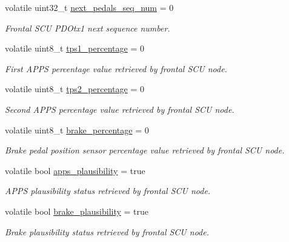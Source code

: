 \begin{DoxyCompactItemize}
volatile uint32\+\_\+t \mbox{\hyperlink{group___c_a_n__servizi__group_gadcbd4ad67b50cf61731266bf5c5ba158}{next\+\_\+pedals\+\_\+seq\+\_\+num}} = 0
\begin{DoxyCompactList}\small\item\em Frontal S\+CU P\+D\+Otx1 next sequence number. \end{DoxyCompactList}\item 
volatile uint8\+\_\+t \mbox{\hyperlink{group___c_a_n__servizi__group_ga1d42f28ccf027a3243fad064fa47ef81}{tps1\+\_\+percentage}} = 0
\begin{DoxyCompactList}\small\item\em First A\+P\+PS percentage value retrieved by frontal S\+CU node. \end{DoxyCompactList}\item 
volatile uint8\+\_\+t \mbox{\hyperlink{group___c_a_n__servizi__group_gaf69d82f83885abc5adbd5fcbf4c421cf}{tps2\+\_\+percentage}} = 0
\begin{DoxyCompactList}\small\item\em Second A\+P\+PS percentage value retrieved by frontal S\+CU node. \end{DoxyCompactList}\item 
volatile uint8\+\_\+t \mbox{\hyperlink{group___c_a_n__servizi__group_ga8e50a30864da7026531520887968d4c0}{brake\+\_\+percentage}} = 0
\begin{DoxyCompactList}\small\item\em Brake pedal position sensor percentage value retrieved by frontal S\+CU node. \end{DoxyCompactList}\item 
\mbox{\label{group___c_a_n__servizi__group_gaa9de48f5a49bc92a608ed315c087f3a6}} 
volatile bool \mbox{\hyperlink{group___c_a_n__servizi__group_gaa9de48f5a49bc92a608ed315c087f3a6}{apps\+\_\+plausibility}} = true
\begin{DoxyCompactList}\small\item\em A\+P\+PS plausibility status retrieved by frontal S\+CU node. \end{DoxyCompactList}\item 
\mbox{\label{group___c_a_n__servizi__group_gae505d69d6ac9d4e7e3c2268ca6cb20b3}} 
volatile bool \mbox{\hyperlink{group___c_a_n__servizi__group_gae505d69d6ac9d4e7e3c2268ca6cb20b3}{brake\+\_\+plausibility}} = true
\begin{DoxyCompactList}\small\item\em Brake plausibility status retrieved by frontal S\+CU node. \end{DoxyCompactList}\item 

\end{DoxyCompactItemize}
